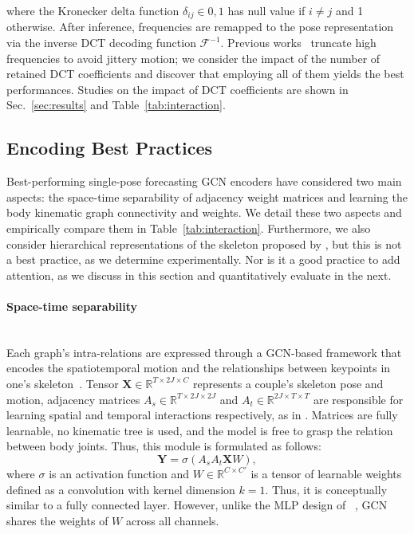 \documentclass[10pt,twocolumn,letterpaper]{article}
\begin{document}
where the Kronecker delta function $\delta_{ij} \in {0,1}$  has null value if $i \neq j$ and 1 otherwise.
After inference, frequencies are remapped to the pose representation via the inverse DCT decoding function $\mathcal{F}^{-1}$.
Previous works~\cite{mao20his, mao21multi} truncate high frequencies to avoid jittery motion; we consider the impact of the number of retained DCT coefficients and discover that employing all of them yields the best performances.
Studies on the impact of DCT coefficients are shown in Sec.~\ref{sec:results} and Table~\ref{tab:interaction}.

\subsection{Encoding Best Practices}\label{ssec:enc}
Best-performing single-pose forecasting GCN encoders have considered two main aspects: the space-time separability of adjacency weight matrices and learning the body kinematic graph connectivity and weights. 
We detail these two aspects and empirically compare them in Table~\ref{tab:interaction}. 
Furthermore, we also consider hierarchical representations of the skeleton proposed by \cite{Dang21}, but this is not a best practice, as we determine experimentally.
Nor is it a good practice to add attention, as we discuss in this section and quantitatively evaluate in the next.

\paragraph{Space-time separability}\label{par:sep} \greencheck \\
Each graph's intra-relations are expressed through a GCN-based framework that encodes the spatiotemporal motion and the relationships between keypoints in one's skeleton~\cite{yan18, sofianos21}.
Tensor $\mathbf{X} \in \mathbb{R}^{T \times 2J \times C}$ represents a couple's skeleton pose and motion, adjacency matrices ${A}_s \in \mathbb{R}^{T \times 2J \times 2J}$ and ${A}_t \in \mathbb{R}^{2J \times T \times T}$ are responsible for learning spatial and temporal interactions respectively, as in \cite{sofianos21}.
Matrices are fully learnable, no kinematic tree is used, and the model is free to grasp the relation between body joints.
Thus, this module is formulated as follows:
\begin{equation}
    \label{eq:gcn}
    {\mathbf{Y}} = \sigma({A}_s{A}_t\mathbf{X}{W}),
\end{equation}
where $\sigma$ is an activation function and $W \in \mathbb{R}^{C \times C'}$ is a tensor of learnable weights defined as a convolution with kernel dimension $k=1$. 
Thus, it is conceptually similar to a fully connected layer. 
However, unlike the MLP design of ~\cite{guo2022back}, GCN shares the weights of $W$ across all channels.
\end{document}
